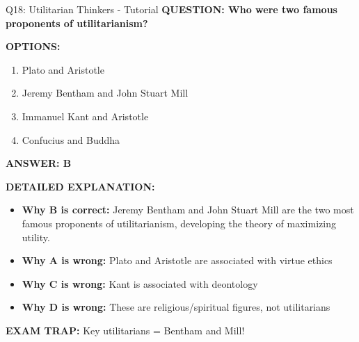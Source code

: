 \documentclass[8pt]{beamer}
\begin{document}
	\begin{frame}{Q18: Utilitarian Thinkers - Tutorial}
		\fontsize{6.5}{7.5}\selectfont
		\textbf{QUESTION: Who were two famous proponents of utilitarianism?}
		
		\vspace{0.1cm}
		\textbf{OPTIONS:}
		\begin{enumerate}
			\item Plato and Aristotle
			\item Jeremy Bentham and John Stuart Mill
			\item Immanuel Kant and Aristotle
			\item Confucius and Buddha
		\end{enumerate}
		
		\vspace{0.1cm}
		\textcolor{myblue}{\textbf{ANSWER: B}}
		
		\vspace{0.1cm}
		\textbf{DETAILED EXPLANATION:}
		\begin{itemize}
			\item \textbf{Why B is correct:} Jeremy Bentham and John Stuart Mill are the two most famous proponents of utilitarianism, developing the theory of maximizing utility.
			\item \textbf{Why A is wrong:} Plato and Aristotle are associated with virtue ethics
			\item \textbf{Why C is wrong:} Kant is associated with deontology
			\item \textbf{Why D is wrong:} These are religious/spiritual figures, not utilitarians
		\end{itemize}
		
		\textcolor{myred}{\textbf{EXAM TRAP:}} Key utilitarians = \textcolor{myblue}{Bentham and Mill}!
	\end{frame}
	
\end{document}
